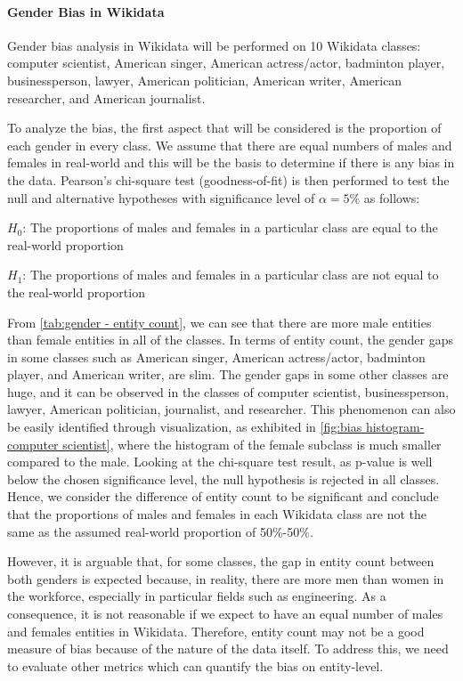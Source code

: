 \paragraph{Gender Bias in Wikidata}
Gender bias analysis in Wikidata will be performed on 10 Wikidata classes: computer scientist, American singer, American actress/actor, badminton player, businessperson, lawyer, American politician, American writer, American researcher, and American journalist.

To analyze the bias, the first aspect that will be considered is the proportion of each gender in every class. We assume that there are equal numbers of males and females in real-world and this will be the basis to determine if there is any bias in the data. Pearson's chi-square test (goodness-of-fit) is then performed to test the null and alternative hypotheses with significance level of \(\alpha=5\%\) as follows:

\(H_0\): The proportions of males and females in a particular class are equal to the real-world proportion

\(H_1\): The proportions of males and females in a particular class are not equal to the real-world proportion

From \autoref{tab:gender - entity count}, we can see that there are more male entities than female entities in all of the classes. In terms of entity count, the gender gaps in some classes such as American singer, American actress/actor, badminton player, and American writer, are slim. The gender gaps in some other classes are huge, and it can be observed in the classes of computer scientist, businessperson, lawyer, American politician, journalist, and researcher. This phenomenon can also be easily identified through visualization, as exhibited in \autoref{fig:bias histogram-computer scientist}, where the histogram of the female subclass is much smaller compared to the male. Looking at the chi-square test result, as p-value is well below the chosen significance level, the null hypothesis is rejected in all classes. Hence, we consider the difference of entity count to be significant and conclude that the proportions of males and females in each Wikidata class are not the same as the assumed real-world proportion of 50\%-50\%.

However, it is arguable that, for some classes, the gap in entity count between both genders is expected because, in reality, there are more men than women in the workforce, especially in particular fields such as engineering. As a consequence, it is not reasonable if we expect to have an equal number of males and females entities in Wikidata. Therefore, entity count may not be a good measure of bias because of the nature of the data itself. To address this, we need to evaluate other metrics which can quantify the bias on entity-level.

